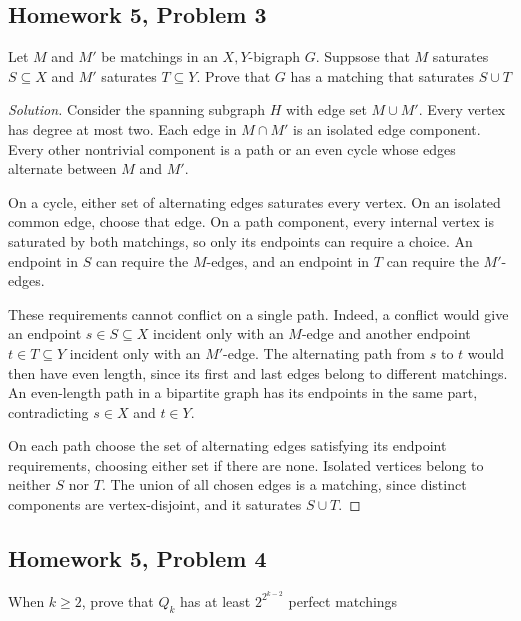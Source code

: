 \documentclass[12pt]{amsart}
\newenvironment{solution}{\begin{proof}[Solution]}{\end{proof}}
\begin{document}
    \subsection*{Homework 5, Problem 3} Let $M$ and $M'$ be matchings in an $X,Y$-bigraph $G$.
    Suppsose that $M$ saturates $S\subseteq X$ and $M'$ saturates $T\subseteq Y$.
    Prove that $G$ has a matching that saturates $S \cup T$

    \begin{solution}
        Consider the spanning subgraph $H$ with edge set $M\cup M'$.
        Every vertex has degree at most two. Each edge in $M\cap M'$
        is an isolated edge component. Every other nontrivial
        component is a path or an even cycle whose edges alternate
        between $M$ and $M'$.

        On a cycle, either set of alternating edges saturates every
        vertex. On an isolated common edge, choose that edge. On a
        path component, every internal vertex is saturated by both
        matchings, so only its endpoints can require a choice.
        An endpoint in $S$ can require the $M$-edges, and an endpoint
        in $T$ can require the $M'$-edges.

        These requirements cannot conflict on a single path.
        Indeed, a conflict would give an endpoint $s\in S\subseteq X$
        incident only with an $M$-edge and another endpoint
        $t\in T\subseteq Y$ incident only with an $M'$-edge.
        The alternating path from $s$ to $t$ would then have even
        length, since its first and last edges belong to different
        matchings. An even-length path in a bipartite graph has its
        endpoints in the same part, contradicting $s\in X$ and
        $t\in Y$.

        On each path choose the set of alternating edges satisfying
        its endpoint requirements, choosing either set if there are
        none. Isolated vertices belong to neither $S$ nor $T$.
        The union of all chosen edges is a matching, since distinct
        components are vertex-disjoint, and it saturates $S\cup T$.
    \end{solution}

    \subsection*{Homework 5, Problem 4} When $k\ge 2$, prove that $Q_k$ has at least $2^{2^{k-2}}$ perfect matchings
\end{document}
